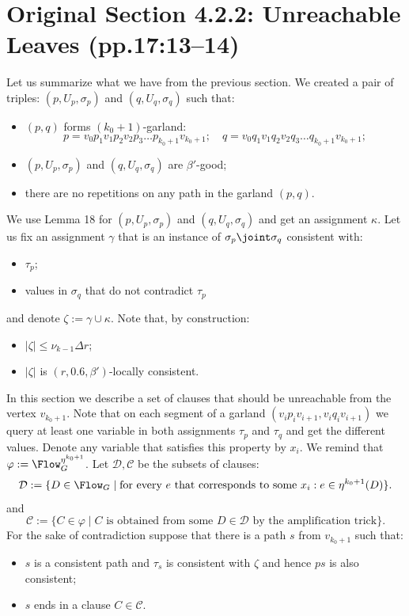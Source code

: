 \section*{Original Section 4.2.2: Unreachable Leaves (pp.17:13--14)}
Let us summarize what we have from the previous section. We created a pair of triples: $(p,U_p,\sigma_p)$ and $(q,U_q,\sigma_q)$ such that:
\begin{itemize}\item $(p,q)$ forms $(k_0+1)$-garland:
\[p=v_0p_1v_1p_2v_2p_3\ldots p_{k_0+1}v_{k_0+1};\quad q=v_0q_1v_1q_2v_2q_3\ldots q_{k_0+1}v_{k_0+1};\]
\item $(p,U_p,\sigma_p)$ and $(q,U_q,\sigma_q)$ are $\beta'$-good;
\item there are no repetitions on any path in the garland $(p,q)$.\end{itemize}
We use Lemma 18 for $(p,U_p,\sigma_p)$ and $(q,U_q,\sigma_q)$ and get an assignment $\kappa$. Let us fix an assignment $\gamma$ that is an instance of $\sigma_p\joint\sigma_q$ consistent with:
\begin{itemize}\item $\tau_p$;
\item values in $\sigma_q$ that do not contradict $\tau_p$\end{itemize}
and denote $\zeta:=\gamma\cup\kappa$. Note that, by construction:
\begin{itemize}\item $|\zeta|\le\nu_{k-1}\Delta r$;
\item $|\zeta|$ is $(r,0.6,\beta')$-locally consistent.\end{itemize}
In this section we describe a set of clauses that should be unreachable from the vertex $v_{k_0+1}$. Note that on each segment of a garland $(v_ip_iv_{i+1},v_iq_iv_{i+1})$ we query at least one variable in both assignments $\tau_p$ and $\tau_q$ and get the different values. Denote any variable that satisfies this property by $x_i$.
We remind that $\varphi:=\Flow_G^{\eta^{k_0+1}}$. Let $\mathcal D,\mathcal C$ be the subsets of clauses:
\[\mathcal D:=\{D\in\Flow_G\mid\text{for every }e\text{ that corresponds to some }x_i:e\in\eta^{k_0+1}(D)\}.\]
and
\[\mathcal C:=\{C\in\varphi\mid C\text{ is obtained from some }D\in\mathcal D\text{ by the amplification trick}\}.\]
For the sake of contradiction suppose that there is a path $s$ from $v_{k_0+1}$ such that:
\begin{itemize}\item $s$ is a consistent path and $\tau_s$ is consistent with $\zeta$ and hence $ps$ is also consistent;
\item $s$ ends in a clause $C\in\mathcal C$.\end{itemize}
